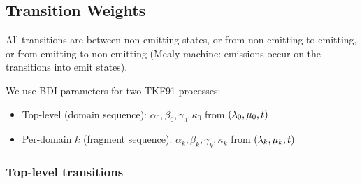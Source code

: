 \subsection{Transition Weights}

All transitions are between non-emitting states, or from non-emitting to
emitting, or from emitting to non-emitting (Mealy machine: emissions occur
on the transitions into emit states).

We use BDI parameters for two TKF91 processes:
\begin{itemize}[nosep]
\item Top-level (domain sequence): $\alpha_0, \beta_0, \gamma_0, \kappa_0$
  from $(\lambda_0, \mu_0, t)$
\item Per-domain $k$ (fragment sequence): $\alpha_k, \beta_k, \gamma_k, \kappa_k$
  from $(\lambda_k, \mu_k, t)$
\end{itemize}

\subsubsection{Top-level transitions}

